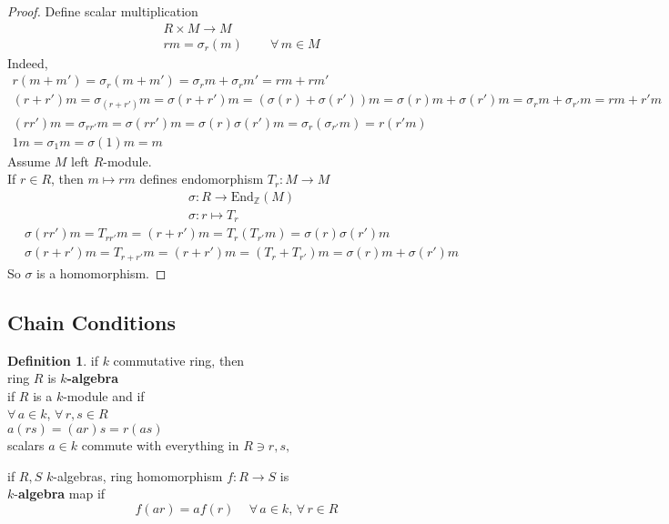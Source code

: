 \documentclass[twoside,landscape]{amsart}
\theoremstyle{plain}
\theoremstyle{definition}
\newtheorem{definition}{Definition}
\theoremstyle{remark}
\begin{document}
\begin{multicols*}{2}
\begin{proof}
Define scalar multiplication 
\[
\begin{aligned}
	& R\times M \to M \\
	& rm = \sigma_r(m) \qquad \, \forall \, m \in M
\end{aligned}
\]
Indeed, 
\[
\begin{gathered}
	r(m+m') = \sigma_r(m+m') = \sigma_rm + \sigma_r m' = rm + rm' \\
 (r+r')m = \sigma_{(r+r')}m = \sigma(r+r')m = (\sigma(r) + \sigma(r')) m = \sigma(r) m + \sigma(r') m = \sigma_r m + \sigma_{r'}m = rm + r'm  \\
(rr')m = \sigma_{rr'}m = \sigma(rr')m = \sigma(r)\sigma(r') m = \sigma_r(\sigma_{r'}m) = r(r'm) \\
1m = \sigma_1 m = \sigma(1)m = m 
\end{gathered}
\]
Assume $M$ left $R$-module.  \\
If $r\in R$, then $m\mapsto rm$ defines endomorphism $T_r:M\to M$
\[
\begin{aligned}
	& \sigma : R \to \text{End}_{\mathbb{Z}}(M) \\ 
	& \sigma :r \mapsto T_r 
\end{aligned}
\]
\[
\begin{aligned}
	& \sigma(rr') m= T_{rr'} m = (r+r')m = T_r(T_{r'}m) = \sigma(r) \sigma(r') m \\ 
	& \sigma(r+r')m = T_{r+r'}m = (r+r')m = (T_r + T_{r'})m = \sigma(r)m + \sigma(r') m 
\end{aligned}
\]
So $\sigma$ is a homomorphism.  


\end{proof}




\subsection{Chain Conditions}

\begin{definition}
  if $k$ commutative ring, then \\
  ring $R$ is \textbf{$k$-algebra} \\
if $R$ is a $k$-module and if \\
$\forall \, a \in k$, $\forall \, r,s \in R$ \\
$a(rs) = (ar)s = r(as)$ \\
scalars $a \in k$ commute with everything in $R \ni r,s,$  
\end{definition}

if $R,S$ $k$-algebras, ring homomorphism $f:R \to S$ is \\
$k$-\textbf{algebra} map if 
\[
f(ar) = af(r) \quad \, \forall \, a \in k , \, \forall \, r \in R
\]


\end{multicols*}
\end{document}
